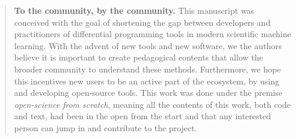 
\begin{quote}
    \textbf{To the community, by the community. }
    This manuscript was conceived with the goal of shortening the gap between developers and practitioners of differential programming tools in modern scientific machine learning. 
    With the advent of new tools and new software, we the authors believe it is important to create pedagogical contents that allow the broader community to understand these methods. 
    Furthermore, we hope this incentives new users to be an active part of the ecosystem, by using and developing open-source tools. 
    This work was done under the premise \textit{open-science from scratch}, meaning all the contents of this work, both code and text, had been in the open from the start and that any interested person can jump in and contribute to the project. 
\end{quote}
